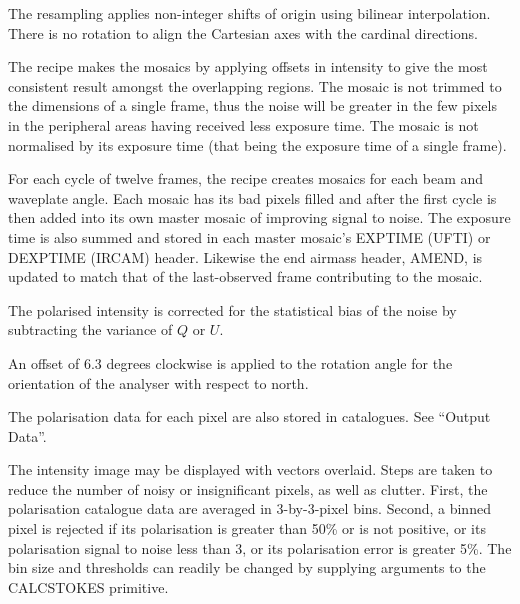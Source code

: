 \documentclass[twoside,11pt]{article}
\newcommand{\htmlref}[2]{#1}
\renewcommand{\_}{\texttt{\symbol{95}}}
\newcommand{\sstitem}{\item}
\begin{document}
{{{         \sstitem
         The resampling applies non-integer shifts of origin using
         bilinear interpolation.  There is no rotation to align the
         Cartesian axes with the cardinal directions.

         \sstitem
         The recipe makes the mosaics by applying offsets in intensity
         to give the most consistent result amongst the overlapping regions.
         The mosaic is not trimmed to the dimensions of a single frame, thus
         the noise will be greater in the few pixels in the peripheral areas
         having received less exposure time.  The mosaic is not normalised by
         its exposure time (that being the exposure time of a single frame).

         \sstitem
         For each cycle of twelve frames, the recipe creates mosaics
         for each beam and waveplate angle.  Each mosaic has its bad pixels
         filled and after the first cycle is then added into its own master
         mosaic of improving signal to noise.  The exposure time is also
         summed and stored in each master mosaic's EXP\_TIME (UFTI) or
         DEXPTIME (IRCAM) header.  Likewise the end airmass header, AMEND,
         is updated to match that of the last-observed frame contributing to
         the mosaic.

         \sstitem
         The polarised intensity is corrected for the statistical bias
         of the noise by subtracting the variance of $Q$ or $U$.

         \sstitem
         An offset of 6.3 degrees clockwise is applied to the rotation
         angle for the orientation of the analyser with respect to north.

         \sstitem
         The polarisation data for each pixel are also stored in
         catalogues.  See \htmlref{``Output Data''}{paj_data}.

         \sstitem
         The intensity image may be displayed with vectors overlaid.
         Steps are taken to reduce the number of noisy or insignificant
         pixels, as well as clutter.  First, the polarisation catalogue data
         are averaged in 3-by-3-pixel bins.  Second, a binned pixel is
         rejected if its polarisation is greater than 50\% or is not positive,
         or its polarisation signal to noise less than 3, or its polarisation
         error is greater 5\%.  The bin size and thresholds can readily be
         changed by supplying arguments to the \_CALC\_STOKES\_ primitive.

}}}
\end{document}

